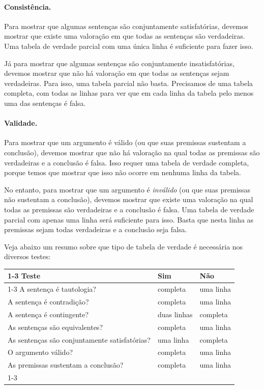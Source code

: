 \paragraph{Consistência.}
Para mostrar que algumas sentenças são conjuntamente satisfatórias, devemos mostrar que existe uma valoração em que todas as sentenças são verdadeiras.
Uma tabela de verdade parcial com uma única linha é suficiente para fazer isso.

Já para mostrar que algumas sentenças são conjuntamente insatisfatórias, devemos mostrar que não há valoração em que todas as sentenças sejam verdadeiras. 
Para isso, uma tabela parcial não basta. Precisamos de uma tabela completa, com todas as linhas para ver que em cada linha da tabela pelo menos uma das sentenças é falsa.

\paragraph{Validade.}
Para mostrar que um argumento é válido (ou que suas premissas sustentam a conclusão), devemos mostrar que não há valoração na qual todas as premissas são verdadeiras e a conclusão é falsa.
Isso requer uma tabela de verdade completa, porque temos que mostrar que isso não ocorre em nenhuma linha da tabela.

No entanto, para mostrar que um argumento é \emph{inválido} (ou que suas premissas não sustentam a conclusão), devemos mostrar que existe uma valoração na qual todas as premissas são verdadeiras e a conclusão é falsa.
Uma tabela de verdade parcial com apenas uma linha será suficiente para isso.
Basta que nesta linha as premissas sejam todas verdadeiras e a conclusão seja falsa.

Veja abaixo um resumo sobre que tipo de tabela de verdade é necessária nos diversos testes:
\begin{center}\label{t:TruthTable}
\begin{tabular}{l l l}
\cline{1-3}
\textbf{Teste} & \textbf{Sim} & \textbf{Não}\\
 \hline
\cline{1-3}
{\small A sentença é tautologia?} & {\small completa} & {\small uma linha} \\
{\small A sentença é  contradição?} &  {\small completa} & {\small uma linha} \\
{\small A sentença é contingente?} & {\small duas linhas} & {\small completa}\\
{\small As sentenças são equivalentes?} & {\small completa}  & {\small uma linha} \\
{\small As sentenças são conjuntamente satisfatórias?} & {\small uma linha} & {\small completa} \\
{\small O argumento válido?} & {\small completa} & {\small uma linha} \\
{\small As premissas sustentam a conclusão?} & {\small completa} & {\small uma linha}\\
\cline{1-3}
\end{tabular}
\end{center}
\label{table.CompleteVsPartial}


